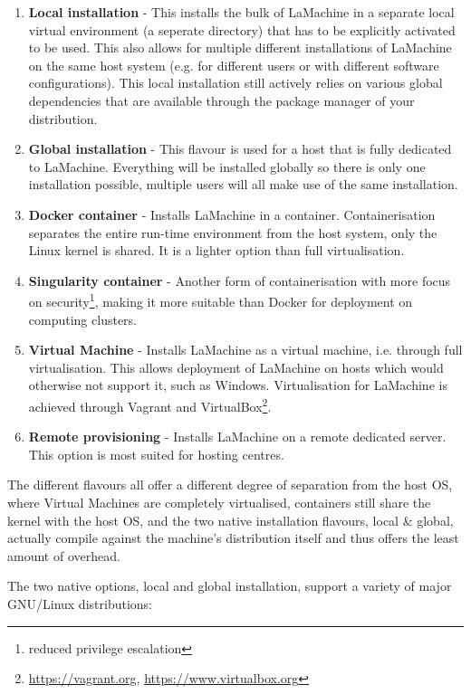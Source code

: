 \documentclass[a4paper,11pt]{article}
\begin{document}
\begin{enumerate}
    \item \textbf{Local installation} - This installs the bulk of LaMachine in a separate local virtual environment (a seperate
        directory) that has to be explicitly activated to be used. This also allows for multiple different installations
        of LaMachine on the same host system (e.g. for different users or with different software configurations).
        This local installation still actively relies on various global dependencies that are available through the
        package manager of your distribution.
    \item \textbf{Global installation} - This flavour is used for a host that is fully dedicated to LaMachine. Everything will be
        installed globally so there is only one installation possible, multiple users will all make use of the same
        installation.
    \item \textbf{Docker container} - Installs LaMachine in a container. Containerisation separates the entire run-time
        environment from the host system, only the Linux kernel is shared. It is a lighter option than full
        virtualisation.
    \item \textbf{Singularity container} - Another form of containerisation with more focus on security\footnote{reduced
        privilege escalation}, making it more suitable than Docker for deployment on computing clusters.
    \item \textbf{Virtual Machine} - Installs LaMachine as a virtual machine, i.e. through full virtualisation. This allows
        deployment of LaMachine on hosts which would otherwise not support it, such as Windows. Virtualisation for
        LaMachine is achieved through Vagrant and VirtualBox\footnote{\url{https://vagrant.org}, \url{https://www.virtualbox.org}}.
    \item \textbf{Remote provisioning} - Installs LaMachine on a remote dedicated server. This option is most suited for
        hosting centres.
\end{enumerate}

The different flavours all offer a different degree of separation from the host OS, where Virtual Machines are
completely virtualised, containers still share the kernel with the host OS, and the two native installation flavours,
local \& global, actually compile against the machine's distribution itself and thus offers the least amount of
overhead.

The two native options, local and global installation, support a variety of major GNU/Linux distributions:
\end{document}

